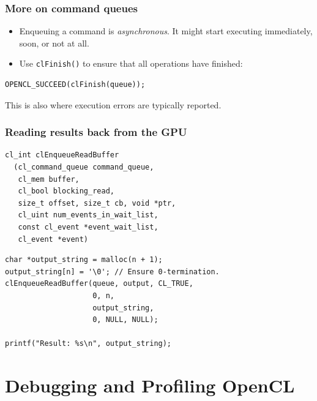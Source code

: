 \documentclass{beamer}
\begin{document}
\begin{frame}[fragile]
  \frametitle{More on command queues}

  \begin{itemize}
  \item Enqueuing a command is \textit{asynchronous}.  It might start
    executing immediately, soon, or not at all.
  \item Use \texttt{clFinish()} to ensure that all operations have
    finished:
  \end{itemize}

\begin{lstlisting}
OPENCL_SUCCEED(clFinish(queue));
\end{lstlisting}

  This is also where execution errors are typically reported.
\end{frame}

\begin{frame}[fragile]
  \frametitle{Reading results back from the GPU}

\begin{lstlisting}[backgroundcolor=\color{lightgray}]
cl_int clEnqueueReadBuffer
  (cl_command_queue command_queue,
   cl_mem buffer,
   cl_bool blocking_read,
   size_t offset, size_t cb, void *ptr,
   cl_uint num_events_in_wait_list,
   const cl_event *event_wait_list,
   cl_event *event)
\end{lstlisting}

\begin{lstlisting}
char *output_string = malloc(n + 1);
output_string[n] = '\0'; // Ensure 0-termination.
clEnqueueReadBuffer(queue, output, CL_TRUE,
                    0, n,
                    output_string,
                    0, NULL, NULL);

printf("Result: %s\n", output_string);
\end{lstlisting}

\end{frame}

\section{Debugging and Profiling OpenCL}

\begin{frame}
	\tableofcontents[currentsection]
\end{frame}
\end{document}
